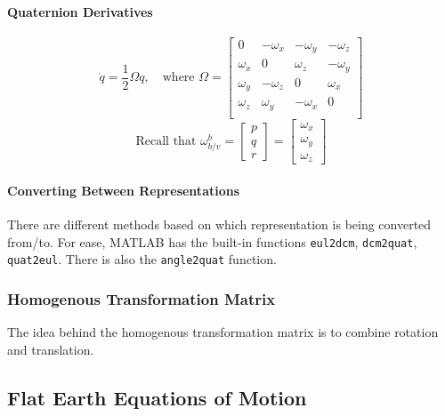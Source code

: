 \documentclass[../notes.tex]{subfiles}
\begin{document}
\paragraph{Quaternion Derivatives}
\begin{equation} \label{eq:quat_derivs}
    \dot{q} = \frac{1}{2}\Omega q, \quad \text{where } \Omega = \begin{bmatrix}
        0 &-\omega_x &-\omega_y &-\omega_z \\
        \omega_x &0 &\omega_z &-\omega_y \\
        \omega_y &-\omega_z &0 &\omega_x \\
        \omega_z &\omega_y &-\omega_x &0 \\
    \end{bmatrix}
\end{equation}
\begin{equation*}
    \text{Recall that } \omega^b_{b/v} = \begin{bmatrix}
        p \\ q \\ r
    \end{bmatrix} = \begin{bmatrix}
        \omega_x \\ \omega_y \\ \omega_z
    \end{bmatrix}
\end{equation*}

\paragraph{Converting Between Representations}
There are different methods based on which representation is being converted from/to. For ease, MATLAB has the built-in functions \verb|eul2dcm|, \verb|dcm2quat|, \verb|quat2eul|. There is also the \verb|angle2quat| function.

\subsubsection{Homogenous Transformation Matrix}
The idea behind the homogenous transformation matrix is to combine rotation and translation.

\subsection{Flat Earth Equations of Motion}
\end{document}
